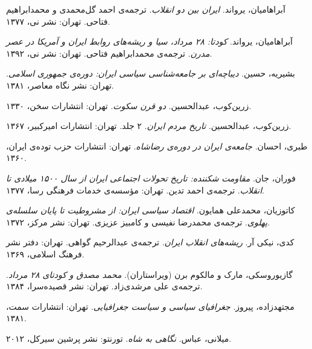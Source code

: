 \begin{enumerate}[label={[\arabic*]}, leftmargin=2cm, itemsep=6pt]

\item آبراهامیان، یرواند. \textit{ایران بین دو انقلاب}. ترجمه‌ی احمد گل‌محمدی و محمدابراهیم فتاحی. تهران: نشر نی، ۱۳۷۷.

\item آبراهامیان، یرواند. \textit{کودتا: ۲۸ مرداد، سیا و ریشه‌های روابط ایران و آمریکا در عصر مدرن}. ترجمه‌ی محمدابراهیم فتاحی. تهران: نشر نی، ۱۳۹۲.

\item بشیریه، حسین. \textit{دیباچه‌ای بر جامعه‌شناسی سیاسی ایران: دوره‌ی جمهوری اسلامی}. تهران: نشر نگاه معاصر، ۱۳۸۱.

\item زرین‌کوب، عبدالحسین. \textit{دو قرن سکوت}. تهران: انتشارات سخن، ۱۳۳۰.

\item زرین‌کوب، عبدالحسین. \textit{تاریخ مردم ایران}. ۲ جلد. تهران: انتشارات امیرکبیر، ۱۳۶۷.

\item طبری، احسان. \textit{جامعه‌ی ایران در دوره‌ی رضاشاه}. تهران: انتشارات حزب توده‌ی ایران، ۱۳۶۰.

\item فوران، جان. \textit{مقاومت شکننده: تاریخ تحولات اجتماعی ایران از سال ۱۵۰۰ میلادی تا انقلاب}. ترجمه‌ی احمد تدین. تهران: مؤسسه‌ی خدمات فرهنگی رسا، ۱۳۷۷.

\item کاتوزیان، محمدعلی همایون. \textit{اقتصاد سیاسی ایران: از مشروطیت تا پایان سلسله‌ی پهلوی}. ترجمه‌ی محمدرضا نفیسی و کامبیز عزیزی. تهران: نشر مرکز، ۱۳۷۲.

\item کدی، نیکی آر. \textit{ریشه‌های انقلاب ایران}. ترجمه‌ی عبدالرحیم گواهی. تهران: دفتر نشر فرهنگ اسلامی، ۱۳۶۹.

\item گازیوروسکی، مارک و مالکوم برن (ویراستاران). \textit{محمد مصدق و کودتای ۲۸ مرداد}. ترجمه‌ی علی مرشدی‌زاد. تهران: نشر قصیده‌سرا، ۱۳۸۴.

\item مجتهدزاده، پیروز. \textit{جغرافیای سیاسی و سیاست جغرافیایی}. تهران: انتشارات سمت، ۱۳۸۱.

\item میلانی، عباس. \textit{نگاهی به شاه}. تورنتو: نشر پرشین سیرکل، ۲۰۱۲.

\end{enumerate}


